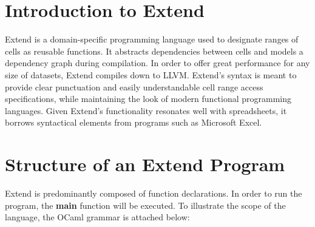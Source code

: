 \section{Introduction to Extend}
	Extend is a domain-specific programming language used to designate ranges of cells as reusable functions. It abstracts dependencies between cells and models a dependency graph during compilation. In order to offer great performance for any size of datasets, Extend compiles down to LLVM.
	\newline
	Extend's syntax is meant to provide clear punctuation and easily understandable cell range access specifications, while maintaining the look of modern functional programming languages. Given Extend's functionality resonates well with spreadsheets, it borrows syntactical elements from programs such as Microsoft Excel.
\section{Structure of an Extend Program}
	Extend is predominantly composed of function declarations. In order to run the program, the \textbf{main} function will be executed. To illustrate the scope of the language, the OCaml grammar is attached below:
